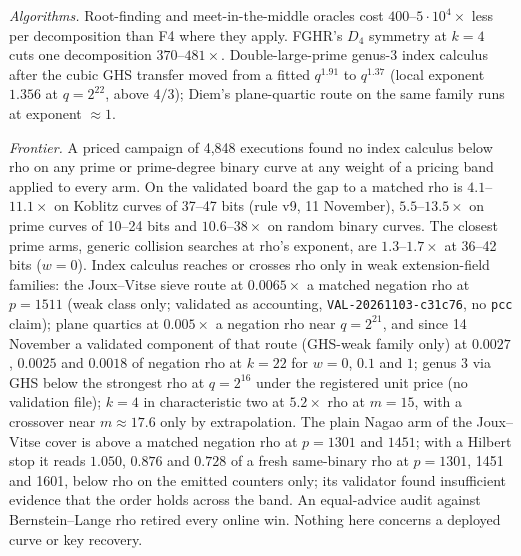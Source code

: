 \emph{Algorithms.} Root-finding and meet-in-the-middle oracles cost
$400$--$5\cdot10^4\times$ less per decomposition than F4 where they apply.
FGHR's $D_4$ symmetry at $k=4$ cuts one decomposition $370$--$481\times$.
Double-large-prime genus-3 index calculus after the cubic GHS transfer
moved from a fitted $q^{1.91}$ to $q^{1.37}$ (local exponent $1.356$ at
$q=2^{22}$, above $4/3$); Diem's plane-quartic route on the same family
runs at exponent $\approx1$.

\emph{Frontier.} A priced campaign of 4{,}848 executions found no index
calculus below rho on any prime or prime-degree binary curve at any weight
of a pricing band applied to every arm. On the validated board the gap to
a matched rho is $4.1$--$11.1\times$ on Koblitz curves of 37--47 bits
(rule v9, 11 November),
$5.5$--$13.5\times$ on prime curves of 10--24 bits and $10.6$--$38\times$
on random binary curves. The closest prime arms, generic collision
searches at rho's exponent, are $1.3$--$1.7\times$ at 36--42 bits ($w=0$).
Index calculus reaches or crosses rho only in weak extension-field
families: the Joux--Vitse sieve route at $0.0065\times$ a matched negation
rho at $p=1511$ (weak class only; validated as accounting,
\texttt{VAL-20261103-c31c76}, no \texttt{pcc} claim); plane quartics at
$0.005\times$ a negation rho near $q=2^{21}$, and since 14 November a
validated component of that route (GHS-weak family only) at $0.0027$,
$0.0025$ and $0.0018$ of negation rho at $k=22$ for $w=0$, $0.1$ and $1$;
genus 3 via GHS below the strongest rho at $q=2^{16}$ under the registered
unit price (no validation file); $k=4$ in characteristic two at $5.2\times$ rho at
$m=15$, with a crossover near $m\approx17.6$ only by extrapolation. The
plain Nagao arm of the Joux--Vitse cover is above a matched negation rho at
$p=1301$ and $1451$; with a Hilbert stop it reads $1.050$, $0.876$ and
$0.728$ of a fresh same-binary rho at $p=1301$, 1451 and 1601, below rho
on the emitted counters only; its validator found insufficient evidence
that the order holds across the band. An equal-advice audit against Bernstein--Lange rho retired every
online win. Nothing here concerns a deployed curve or key recovery.
